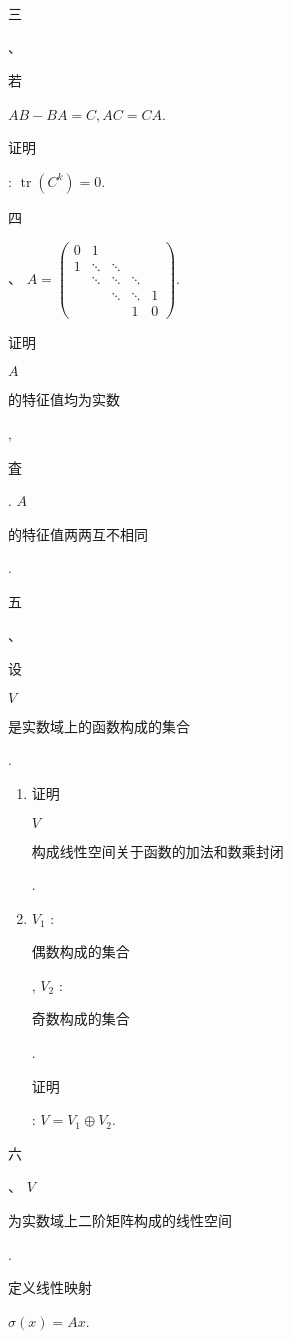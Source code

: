 \documentclass[10pt]{article}
\begin{document}
\begin{CJK}{UTF8}{mj}三\end{CJK}、\begin{CJK}{UTF8}{mj}若\end{CJK} $A B-B A=C, A C=C A$. \begin{CJK}{UTF8}{mj}证明\end{CJK}: $\operatorname{tr}\left(C^{k}\right)=0$.

\begin{CJK}{UTF8}{mj}四\end{CJK}、 $A=\left(\begin{array}{ccccc}0 & 1 & & & \\ 1 & \ddots & \ddots & & \\ & \ddots & \ddots & \ddots & \\ & & \ddots & \ddots & 1 \\ & & & 1 & 0\end{array}\right)$. \begin{CJK}{UTF8}{mj}证明\end{CJK} $A$ \begin{CJK}{UTF8}{mj}的特征值均为实数\end{CJK}, \begin{CJK}{UTF8}{mj}査\end{CJK}. $A$ \begin{CJK}{UTF8}{mj}的特征值两两互不相同\end{CJK}.

\begin{CJK}{UTF8}{mj}五\end{CJK}、\begin{CJK}{UTF8}{mj}设\end{CJK} $V$ \begin{CJK}{UTF8}{mj}是实数域上的函数构成的集合\end{CJK}.

\begin{enumerate}
  \item \begin{CJK}{UTF8}{mj}证明\end{CJK} $V$ \begin{CJK}{UTF8}{mj}构成线性空间关于函数的加法和数乘封闭\end{CJK}.

  \item $V_{1}$ : \begin{CJK}{UTF8}{mj}偶数构成的集合\end{CJK}, $V_{2}$ : \begin{CJK}{UTF8}{mj}奇数构成的集合\end{CJK}. \begin{CJK}{UTF8}{mj}证明\end{CJK}: $V=V_{1} \oplus V_{2}$.

\end{enumerate}
\begin{CJK}{UTF8}{mj}六\end{CJK}、 $V$ \begin{CJK}{UTF8}{mj}为实数域上二阶矩阵构成的线性空间\end{CJK}. \begin{CJK}{UTF8}{mj}定义线性映射\end{CJK} $\sigma(x)=A x$.
\end{document}
